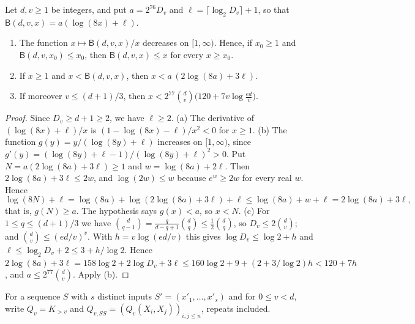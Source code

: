 \begin{lemma}\label{lem:invert}
Let $d,v\ge1$ be integers, and put $a=2^{76}D_v$ and
$\ell=\lceil\log_2D_v\rceil+1$, so that $\mathsf B(d,v,x)=a(\log(8x)+\ell)$.
\begin{enumerate}
\item[(a)] The function $x\mapsto\mathsf B(d,v,x)/x$ decreases on
$[1,\infty)$. Hence, if $x_0\ge1$ and $\mathsf B(d,v,x_0)\le x_0$, then
$\mathsf B(d,v,x)\le x$ for every $x\ge x_0$.
\item[(b)] If $x\ge1$ and $x<\mathsf B(d,v,x)$, then
$x<a\,(2\log(8a)+3\ell)$.
\item[(c)] If moreover $v\le(d+1)/3$, then
$x<2^{77}\binom dv\bigl(120+7v\log\frac{ed}v\bigr)$.
\end{enumerate}
\end{lemma}
\begin{proof}
Since $D_v\ge d+1\ge2$, we have $\ell\ge2$. (a) The derivative of
$(\log(8x)+\ell)/x$ is $(1-\log(8x)-\ell)/x^2<0$ for $x\ge1$. (b) The
function $g(y)=y/(\log(8y)+\ell)$ increases on $[1,\infty)$, since
$g'(y)=(\log(8y)+\ell-1)/(\log(8y)+\ell)^2>0$. Put $N=a(2\log(8a)+3\ell)\ge1$
and $w=\log(8a)+2\ell$. Then $2\log(8a)+3\ell\le2w$, and $\log(2w)\le w$
because $e^w\ge2w$ for every real $w$. Hence
\[
 \log(8N)+\ell=\log(8a)+\log(2\log(8a)+3\ell)+\ell
 \le\log(8a)+w+\ell=2\log(8a)+3\ell,
\]
that is, $g(N)\ge a$. The hypothesis says $g(x)<a$, so $x<N$.
(c) For $1\le q\le(d+1)/3$ we have
$\binom d{q-1}=\frac q{d-q+1}\binom dq\le\frac12\binom dq$, so
$D_v\le2\binom dv$; and $\binom dv\le(ed/v)^v$. With $h=v\log(ed/v)$ this
gives $\log D_v\le\log2+h$ and $\ell\le\log_2D_v+2\le3+h/\log2$. Hence
$2\log(8a)+3\ell=158\log2+2\log D_v+3\ell\le160\log2+9+(2+3/\log2)h
<120+7h$, and $a\le2^{77}\binom dv$. Apply (b).
\end{proof}

For a sequence $S$ with $s$ distinct inputs $S'=(x'_1,\ldots,x'_s)$ and for
$0\le v<d$, write $Q_v=K_{>v}$ and $Q_{v,SS}=(Q_v(X_i,X_j))_{i,j\le n}$,
repeats included.

